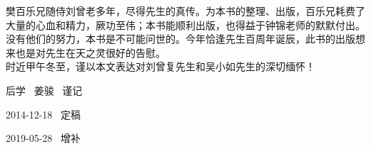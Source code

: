 {\textrm{樊百乐兄随侍刘曾老多年，尽得先生的真传。为本书的整理、出版，百乐兄耗费了大量的心血和精力，厥功至伟；本书能顺利出版，也得益于钟锦老师的默默付出。没有他们的努力，本书是不可能问世的。今年恰逢先生百周年诞辰，此书的出版想来也是对先生在天之灵很好的告慰。}\\

\textrm{时近甲午冬至，谨以本文表达对刘曾复先生和吴小如先生的深切缅怀！}

\begin{flushright}
\textrm{后学~ 姜骏~ 谨记~~~}

\textrm{2014-12-18~ 定稿~~}

\textrm{2019-05-28~ 增补~~~}
\end{flushright}
}
